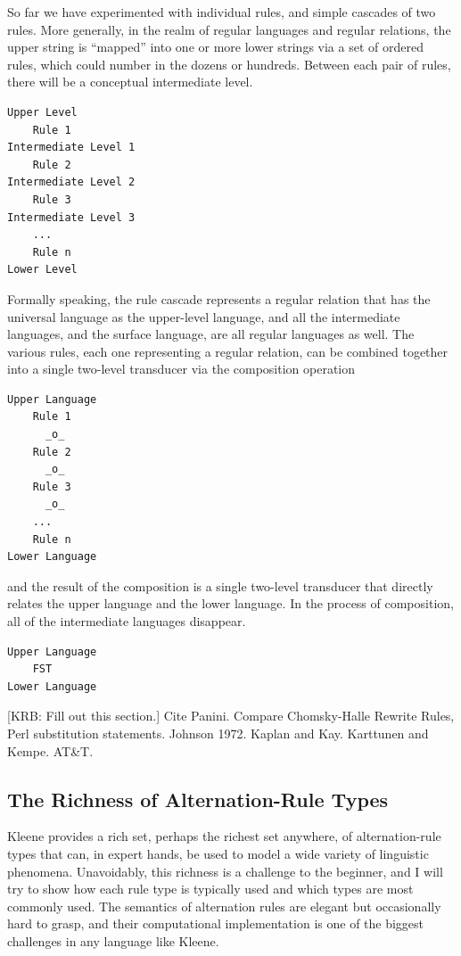 So far we have experimented with individual rules, and simple cascades of two rules.
More generally, in the realm of regular languages and
regular relations, the upper string  is ``mapped'' into one or more 
lower strings via a set of ordered rules, which could number in the dozens or hundreds.  Between each
pair of rules, there will be a conceptual intermediate level.


\begin{Verbatim}
Upper Level
    Rule 1
Intermediate Level 1
    Rule 2
Intermediate Level 2
    Rule 3
Intermediate Level 3
    ...
    Rule n
Lower Level
\end{Verbatim}

\noindent
Formally speaking, the rule cascade represents a regular relation that
has the universal language as
the upper-level language, and all the intermediate languages, and the surface language, are all regular
languages as well.  The various rules, each one representing a regular relation, can be combined
together into a single two-level transducer via the composition operation

\begin{samepage}
\begin{Verbatim}
Upper Language
    Rule 1
      _o_
    Rule 2
      _o_
    Rule 3
      _o_
    ...
    Rule n
Lower Language
\end{Verbatim}
\end{samepage}

\noindent
and the result of the composition is a single two-level transducer that directly relates the upper
language and the lower language.  In the process of composition, all of the intermediate languages disappear.

\begin{Verbatim}
Upper Language
	FST
Lower Language
\end{Verbatim}


[KRB:  Fill out this section.]  Cite Panini.  Compare Chomsky-Halle Rewrite Rules, Perl substitution statements.
Johnson 1972.  Kaplan and Kay.  Karttunen and Kempe.  AT\&T.


\subsection{The Richness of Alternation-Rule Types}

Kleene provides a rich set, perhaps the richest set anywhere, of alternation-rule types
that can, in expert hands, be used to model a wide variety of linguistic phenomena.
Unavoidably, this richness is a challenge to the beginner, and I will try to show how
each rule type is typically used and which types are most commonly used.  The semantics
of alternation rules are elegant but occasionally hard to grasp, and their computational
implementation is one of the biggest challenges in any language like Kleene.

